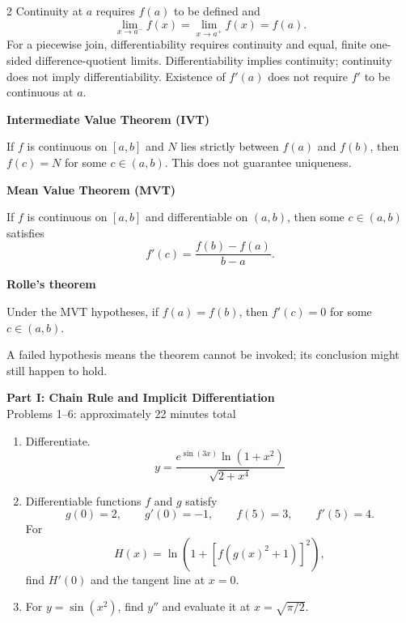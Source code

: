\documentclass[11pt]{article}
\begin{document}
\begin{multicols}{2}
Continuity at $a$ requires $f(a)$ to be defined and
\[
  \lim_{x\to a^-}f(x)=\lim_{x\to a^+}f(x)=f(a).
\]
For a piecewise join, differentiability requires continuity and equal,
finite one-sided difference-quotient limits. Differentiability implies
continuity; continuity does not imply differentiability. Existence of
$f'(a)$ does not require $f'$ to be continuous at $a$.

\medskip
\textbf{Intermediate Value Theorem (IVT)}

If $f$ is continuous on $[a,b]$ and $N$ lies strictly between $f(a)$ and
$f(b)$, then $f(c)=N$ for some $c\in(a,b)$. This does not guarantee uniqueness.

\medskip
\textbf{Mean Value Theorem (MVT)}

If $f$ is continuous on $[a,b]$ and differentiable on $(a,b)$, then some
$c\in(a,b)$ satisfies
\[
  f'(c)=\frac{f(b)-f(a)}{b-a}.
\]

\textbf{Rolle's theorem}

Under the MVT hypotheses, if $f(a)=f(b)$, then $f'(c)=0$ for some
$c\in(a,b)$.

\medskip
A failed hypothesis means the theorem cannot be invoked; its conclusion
might still happen to hold.
\end{multicols}

\newpage
\begin{center}
  {\large\textbf{Part I: Chain Rule and Implicit Differentiation}}\\[2pt]
  Problems 1--6: approximately 22 minutes total
\end{center}

\begin{enumerate}[leftmargin=*,itemsep=0pt]
  \item Differentiate.
  \[
    y=\frac{e^{\sin(3x)}\ln(1+x^2)}{\sqrt{2+x^4}}
  \]

  \item Differentiable functions $f$ and $g$ satisfy
  \[
    g(0)=2,\qquad g'(0)=-1,\qquad f(5)=3,\qquad f'(5)=4.
  \]
  For
  \[
    H(x)=\ln\!\left(1+\left[f\!\left(g(x)^2+1\right)\right]^2\right),
  \]
  find $H'(0)$ and the tangent line at $x=0$.

  \item For $y=\sin(x^2)$, find $y''$ and evaluate it at
  $x=\sqrt{\pi/2}$.
\end{enumerate}
\end{document}
